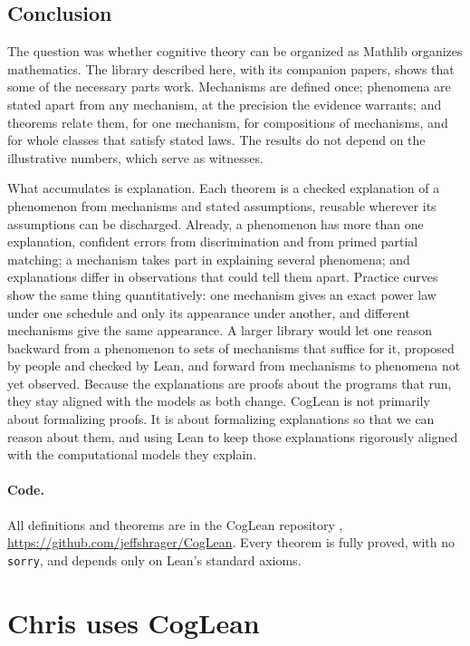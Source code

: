 \documentclass[11pt]{article}
\newcommand{\code}[1]{\texttt{#1}}
\begin{document}
\subsection{Conclusion}

The question was whether cognitive theory can be organized as Mathlib organizes mathematics. The library described here, with its companion papers, shows that some of the necessary parts work. Mechanisms are defined once; phenomena are stated apart from any mechanism, at the precision the evidence warrants; and theorems relate them, for one mechanism, for compositions of mechanisms, and for whole classes that satisfy stated laws. The results do not depend on the illustrative numbers, which serve as witnesses.

What accumulates is explanation. Each theorem is a checked explanation of a phenomenon from mechanisms and stated assumptions, reusable wherever its assumptions can be discharged. Already, a phenomenon has more than one explanation, confident errors from discrimination and from primed partial matching; a mechanism takes part in explaining several phenomena; and explanations differ in observations that could tell them apart. Practice curves show the same thing quantitatively: one mechanism gives an exact power law under one schedule and only its appearance under another, and different mechanisms give the same appearance. A larger library would let one reason backward from a phenomenon to sets of mechanisms that suffice for it, proposed by people and checked by Lean, and forward from mechanisms to phenomena not yet observed. Because the explanations are proofs about the programs that run, they stay aligned with the models as both change. CogLean is not primarily about formalizing proofs. It is about formalizing explanations so that we can reason about them, and using Lean to keep those explanations rigorously aligned with the computational models they explain.

\paragraph{Code.} All definitions and theorems are in the CogLean repository \citep{coglean}, \url{https://github.com/jeffshrager/CogLean}. Every theorem is fully proved, with no \code{sorry}, and depends only on Lean's standard axioms.




\appendix
\clearpage
\section{Chris uses CogLean}
\label{app:chris}
\end{document}
